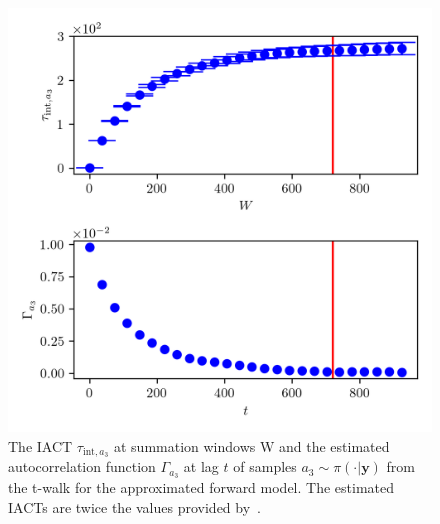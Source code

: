 \begin{figure}[ht!]
	\centering
	\includegraphics{UwerrTauIntTWalk11.png}
	\caption[IACT and autocorrelation function of samples $a_3 \sim \pi(\cdot|\bm{y})$, for approximated model.]{The IACT $\tau_{\text{int},a_3}$ at summation windows W and the estimated autocorrelation function $\Gamma_{a_3}$ at lag $t$ of samples $a_3 \sim \pi( \cdot| \bm{y})$ from the t-walk for the approximated forward model.
	The estimated IACTs are twice the values provided by~\cite{drikHesse, UwerrM}.}
	\label{fig:TWalkIATC12}
\end{figure}
